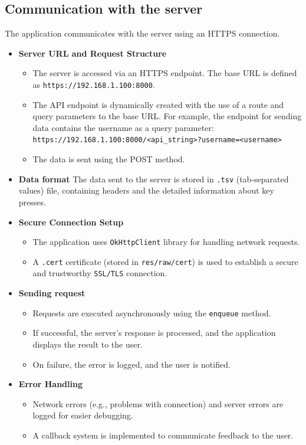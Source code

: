 \subsection{Communication with the server}

The application communicates with the server using an HTTPS connection.
\begin{itemize}
	\item 
	\textbf{Server URL and Request Structure}
	\begin{itemize}
		\item 
		The server is accessed via an HTTPS endpoint. The base URL is defined as \newline \texttt{https://192.168.1.100:8000}.
		\item 
		The API endpoint is dynamically created with the use of a route and query parameters to the base URL. For example, the endpoint for sending data contains the username as a query parameter: \newline
		\texttt{https://192.168.1.100:8000/<api\_string>?username=<username>}
		\item 
		The data is sent using the POST method.
	\end{itemize}
	\item
	\textbf{Data format} \newline
	The data sent to the server is stored in \texttt{.tsv} (tab-separated values) file, containing headers and the detailed information about key presses.
	\item 
	\textbf{Secure Connection Setup}
	\begin{itemize}
		\item 
		The application uses \texttt{OkHttpClient} library for handling network requests.
		\item 
		A \texttt{.cert} certificate (stored in \texttt{res/raw/cert}) is used to establish a secure and trustworthy \texttt{SSL/TLS} connection.
	\end{itemize}
	\item 
	\textbf{Sending request}
	\begin{itemize}
		\item 
		Requests are executed asynchronously using the \texttt{enqueue} method.
		\item 
		If successful, the server's response is processed, and the application displays the result to the user.
		\item 
		On failure, the error is logged, and the user is notified.  
	\end{itemize}
	\item 
	\textbf{Error Handling}
	\begin{itemize}
		\item 
		Network errors (e.g., problems with connection) and server errors are logged for easier debugging.
		\item 
		A callback system is implemented to communicate feedback to the user. 
	\end{itemize}
	
	
\end{itemize}

